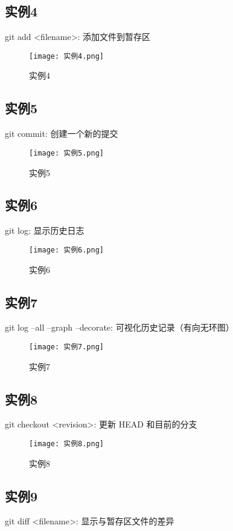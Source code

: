 \documentclass[a4paper, 12pt]{article}
\begin{document}
\subsection{实例4}
git add <filename>: 添加文件到暂存区

\begin{figure}[h!]
  \centering
  \texttt{[image: 实例4.png]}
  \caption{实例4}
\end{figure}

\subsection{实例5}
git commit: 创建一个新的提交

\begin{figure}[h!]
  \centering
  \texttt{[image: 实例5.png]}
  \caption{实例5}
\end{figure}

\subsection{实例6}
git log: 显示历史日志

\begin{figure}[h!]
  \centering
  \texttt{[image: 实例6.png]}
  \caption{实例6}
\end{figure}

\subsection{实例7}
git log --all --graph --decorate: 可视化历史记录（有向无环图）

\begin{figure}[h!]
  \centering
  \texttt{[image: 实例7.png]}
  \caption{实例7}
\end{figure}

\subsection{实例8}
git checkout <revision>: 更新 HEAD 和目前的分支

\begin{figure}[h!]
  \centering
  \texttt{[image: 实例8.png]}
  \caption{实例8}
\end{figure}

\subsection{实例9}
git diff <filename>: 显示与暂存区文件的差异
\end{document}
